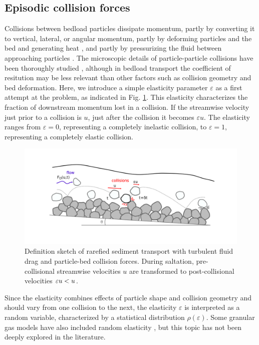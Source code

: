 \subsection{Episodic collision forces}
Collisions between bedload particles dissipate momentum, partly by converting it to vertical, lateral, or angular momentum, partly by deforming particles and the bed and generating heat \citep{Schmeeckle2014,Williams2021}, and partly by pressurizing the fluid between approaching particles \citep{Joseph2001,Schmeeckle2001}. 
The microscopic details of particle-particle collisions have been thoroughly studied \citep{Brach1989, Lorenz1997,Montaine2011}, although in bedload transport the coefficient of resitution may be less relevant than other factors such as collision geometry and bed deformation. Here, we introduce a simple elasticity parameter $\varepsilon$ as a first attempt at the problem, as indicated in Fig. \ref{fig:fig1}. This elasticity characterizes the fraction of downstream momentum lost in a collision. If the streamwise velocity just prior to a collision is $u$, just after the collision it becomes $\varepsilon u$. The elasticity ranges from $\varepsilon=0$, representing a completely inelastic collision, to $\varepsilon=1$, representing a completely elastic collision.
\begin{figure}
	\centerline{\includegraphics{./figures/ch5/Fig1Concept.png}}
	\caption{Definition sketch of rarefied sediment transport with turbulent fluid drag and particle-bed collision forces. During saltation, pre-collisional streamwise velocities $u$ are transformed to post-collisional velocities $\varepsilon u < u$.}
	\label{fig:fig1}
\end{figure}

Since the elasticity combines effects of particle shape and collision geometry and should vary from one collision to the next, the elasticity $\varepsilon$ is interpreted as a random variable, characterized by a statistical distribution $\rho(\varepsilon)$.
Some granular gas models have also included random elasticity \citep[e.g.][]{Serero2015}, but this topic has not been deeply explored in the literature.


